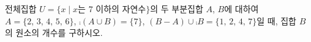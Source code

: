 전체집합 $U=\{x \mid x$는 $7$ 이하의 자연수$\}$의 두 부분집합 $A$, $B$에 대하여 $A=\{2,\,3,\,4,\,5,\,6\}$, $\comp{(A\cup B)}=\{7\}$, $(B-A)\cup\comp{B}=\{1,\,2,\,4,\,7\}$일 때, 집합 $B$의 원소의 개수를 구하시오.
